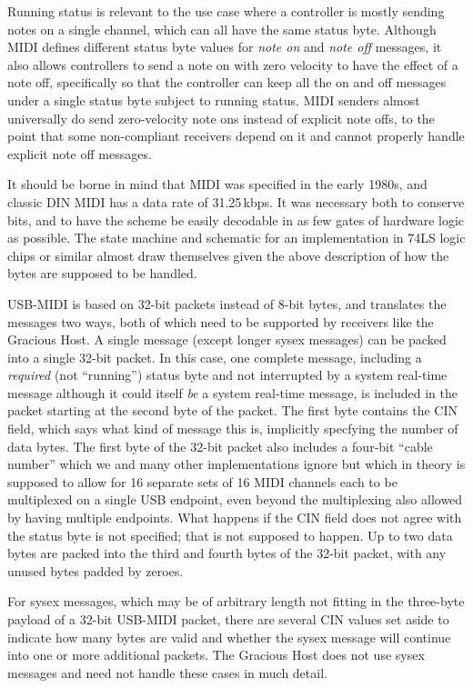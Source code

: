 Running status is relevant to the use case where a controller is mostly
sending notes on a single channel, which can all have the same status byte. 
Although MIDI defines different status byte values for \emph{note on} and
\emph{note off} messages, it also allows controllers to send a note on with
zero velocity to have the effect of a note off, specifically so that the
controller can keep all the on and off messages under a single status byte
subject to running status.  MIDI senders almost universally do send
zero-velocity note ons instead of explicit note offs, to the point that some
non-compliant receivers depend on it and cannot properly handle explicit
note off messages.

It should be borne in mind that MIDI was specified in the early 1980s, and
classic DIN MIDI has a data rate of 31.25\,kbps.  It was necessary both to
conserve bits, and to have the scheme be easily decodable in as few gates of
hardware logic as possible.  The state machine and schematic for an
implementation in 74LS logic chips or similar almost draw themselves given
the above description of how the bytes are supposed to be handled.

USB-MIDI is based on 32-bit packets instead of 8-bit bytes, and translates
the messages two ways, both of which need to be supported by receivers like
the Gracious Host.  A single message (except longer sysex messages) can be
packed into a single 32-bit packet.  In this case, one complete message,
including a \emph{required} (not ``running'') status byte and not
interrupted by a system real-time message although it could itself \emph{be}
a system real-time message, is included in the packet starting at the second
byte of the packet.  The first byte contains the CIN field, which says what
kind of message this is, implicitly specfying the number of data bytes.  The
first byte of the 32-bit packet also includes a four-bit ``cable number''
which we and many other implementations ignore but which in theory is
supposed to allow for 16 separate sets of 16 MIDI channels each to be
multiplexed on a single USB endpoint, even beyond the multiplexing also
allowed by having multiple endpoints.  What happens if the CIN field does
not agree with the status byte is not specified; that is not supposed to
happen.  Up to two data bytes are packed into the third and fourth bytes of
the 32-bit packet, with any unused bytes padded by zeroes.

For sysex messages, which may be of arbitrary length not fitting in the
three-byte payload of a 32-bit USB-MIDI packet, there are several CIN values
set aside to indicate how many bytes are valid and whether the sysex message
will continue into one or more additional packets.  The Gracious Host does
not use sysex messages and need not handle these cases in much detail.


